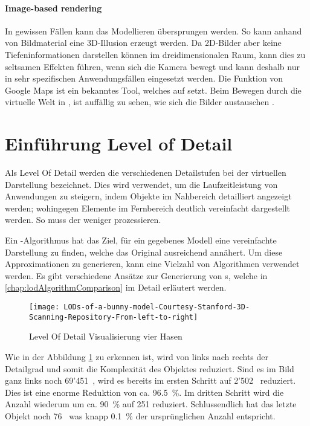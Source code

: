 \paragraph{Image-based rendering}
In gewissen Fällen kann das Modellieren übersprungen werden. So kann anhand von Bildmaterial eine 3D-Illusion erzeugt werden. Da 2D-Bilder aber keine Tiefeninformationen darstellen können im dreidimensionalen Raum, kann dies zu seltsamen Effekten führen, wenn sich die Kamera bewegt und kann deshalb nur in sehr spezifischen Anwendungsfällen eingesetzt werden. Die  Funktion von Google Maps ist ein bekanntes Tool, welches auf  setzt.
Beim Bewegen durch die virtuelle Welt in , ist auffällig zu sehen, wie sich die Bilder austauschen \cite{imageBasedRendering}.

\section{Einführung Level of Detail}
\label{chap:lodIntroduction}
Als Level Of Detail werden die verschiedenen Detailstufen bei der virtuellen Darstellung bezeichnet.
Dies wird verwendet, um die Laufzeitleistung von Anwendungen zu steigern, indem Objekte im Nahbereich detailliert angezeigt werden; wohingegen Elemente im Fernbereich deutlich vereinfacht dargestellt werden. So muss der  weniger  prozessieren.

Ein -Algorithmus hat das Ziel, für ein gegebenes Modell eine vereinfachte Darstellung zu finden, welche das Original ausreichend annähert. Um diese Approximationen zu generieren, kann eine Vielzahl von Algorithmen verwendet werden. Es gibt verschiedene Ansätze zur Generierung von s, welche in \autoref{chap:lodAlgorithmComparison} im Detail erläutert werden.

\begin{figure}[H]
\centering
\texttt{[image: LODs-of-a-bunny-model-Courtesy-Stanford-3D-Scanning-Repository-From-left-to-right]}
\caption{Level Of Detail Visualisierung vier Hasen \cite{stanfordBunnyModel}}
\label{fig:LevelOfDetailVisualisierungvierHasen}
\end{figure}

Wie in der Abbildung \ref{fig:LevelOfDetailVisualisierungvierHasen} zu erkennen ist, wird von links nach rechts der Detailgrad und somit die Komplexität des Objektes reduziert. Sind es im Bild ganz links noch 69'451 , wird es bereits im ersten Schritt auf 2'502  reduziert. Dies ist eine enorme Reduktion von ca. 96.5 \%. Im dritten Schritt wird die Anzahl  wiederum um ca. 90 \% auf 251 reduziert. Schlussendlich hat das letzte Objekt noch 76  was knapp 0.1 \% der ursprünglichen Anzahl entspricht.

